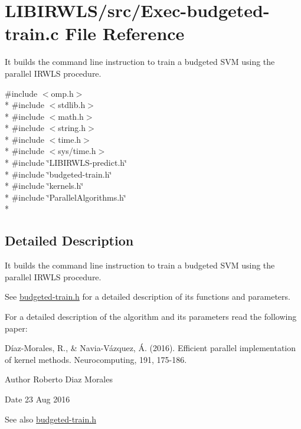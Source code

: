 \hypertarget{Exec-budgeted-train_8c}{}\section{L\+I\+B\+I\+R\+W\+L\+S/src/\+Exec-\/budgeted-\/train.c File Reference}
\label{Exec-budgeted-train_8c}


It builds the command line instruction to train a budgeted S\+VM using the parallel I\+R\+W\+LS procedure.  


{\ttfamily \#include $<$omp.\+h$>$}\\*
{\ttfamily \#include $<$stdlib.\+h$>$}\\*
{\ttfamily \#include $<$math.\+h$>$}\\*
{\ttfamily \#include $<$string.\+h$>$}\\*
{\ttfamily \#include $<$time.\+h$>$}\\*
{\ttfamily \#include $<$sys/time.\+h$>$}\\*
{\ttfamily \#include \char`\"{}L\+I\+B\+I\+R\+W\+L\+S-\/predict.\+h\char`\"{}}\\*
{\ttfamily \#include \char`\"{}budgeted-\/train.\+h\char`\"{}}\\*
{\ttfamily \#include \char`\"{}kernels.\+h\char`\"{}}\\*
{\ttfamily \#include \char`\"{}Parallel\+Algorithms.\+h\char`\"{}}\\*


\subsection{Detailed Description}
It builds the command line instruction to train a budgeted S\+VM using the parallel I\+R\+W\+LS procedure. 

See \hyperlink{budgeted-train_8h}{budgeted-\/train.\+h} for a detailed description of its functions and parameters.

For a detailed description of the algorithm and its parameters read the following paper\+:

Díaz-\/\+Morales, R., \& Navia-\/\+Vázquez, Á. (2016). Efficient parallel implementation of kernel methods. Neurocomputing, 191, 175-\/186.

\begin{DoxyAuthor}{Author}
Roberto Diaz Morales 
\end{DoxyAuthor}
\begin{DoxyDate}{Date}
23 Aug 2016 
\end{DoxyDate}
\begin{DoxySeeAlso}{See also}
\hyperlink{budgeted-train_8h}{budgeted-\/train.\+h} 
\end{DoxySeeAlso}
